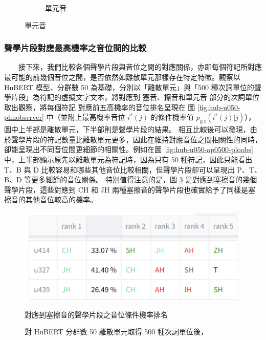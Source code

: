 {\begin{figure}
\begin{subfigure}{\textwidth}
                 \caption{單元音}
                 \label{fig:hub-u050-ap0500-vowobs}
             \end{subfigure}

                         \label{fig:hub-u050-phnobserver--3}
        \end{figure}
    }

\subsubsection{聲學片段對應最高機率之音位間的比較}

　　接下來，我們比較各個聲學片段與音位之間的對應關係，亦即每個符記所對應最可能的前幾個音位之間，是否依然如離散單元那樣存在特定特徵。觀察以 HuBERT 模型、分群數 50 為基礎，分別以「離散單元」與「500 種次詞單位的聲學片段」為符記的虛擬文字文本，將對應到
塞音、擦音和單元音
部分的次詞單位取出觀察，將每個符記
對應前五高機率的音位排名呈現在
圖 \ref{fig:hub-u050-phnobserver} 中（並附上最高機率音位 $i^*(j)$ 的條件機率值 $p_{y|z}(i^*(j)|j)$），圖中上半部是離散單元，下半部則是聲學片段的結果。
相互比較後可以發現，由於聲學片段的符記數量比離散單元更多，因此在維持對應音位之間相關性的同時，卻能呈現出不同音位間更細節的相關性。例如在圖 \ref{fig:hub-u050-ap0500-ploobs} 中，上半部顯示原先以離散單元為符記時，因為只有 50 種符記，因此只能看出 T、B 與 D 比較容易和哪些其他音位比較相關，但聲學片段卻可以呈現出 P、T、B、D 等更多細節的音位關係。
特別值得注意的是，圖 \ref{fig:aff} 是對應到塞擦音的幾個聲學片段，這些對應到 CH 和 JH 兩種塞擦音的聲學片段也確實給予了同樣是塞擦音的其他音位較高的機率。
    \begin{figure}
        \centering
        \includegraphics[width=0.8\linewidth]{chapters/aff-hub50-500.png}
        \caption{對 HuBERT 分群數 50 離散單元取得 500 種次詞單位後，}
        對應到塞擦音的聲學片段之音位條件機率排名
        \label{fig:aff}
    \end{figure}


